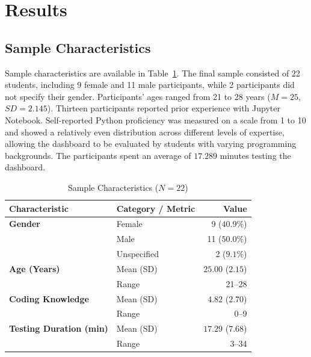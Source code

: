\section{Results}
\subsection{Sample Characteristics}

Sample characteristics are available in Table~\ref{tab:sample_characteristics}. The final sample consisted of 22 students, including 9 female and 11 male participants, while 2 participants did not specify their gender. Participants' ages ranged from 21 to 28 years ($M = 25$, $SD = 2.145$). Thirteen participants reported prior experience with Jupyter Notebook. Self-reported Python proficiency was measured on a scale from 1 to 10 and showed a relatively even distribution across different levels of expertise, allowing the dashboard to be evaluated by students with varying programming backgrounds. The participants spent an average of $17.289$ minutes testing the dashboard.
\begin{table}
  \centering
  \caption{Sample Characteristics ($N=22$)}
  \label{tab:sample_characteristics}
  \small
  \begin{tabular}{@{} l l r @{}} 
    \toprule
    \textbf{Characteristic} & \textbf{Category / Metric} & {\textbf{Value}} \\
    \midrule
    \textbf{Gender}         & Female                & 9 ($40.9\%$) \\
                            & Male                  & 11 ($50.0\%$) \\
                            & Unspecified           & 2 ($9.1\%$) \\
    \addlinespace
    \textbf{Age (Years)}    & Mean (SD)             & $25.00$ ($2.15$) \\
                            & Range                 & {21--28} \\
    \addlinespace
    \textbf{Coding Knowledge} & Mean (SD)          & $4.82$ ($2.70$) \\
                            & Range                 & {0--9} \\
    \addlinespace
    \textbf{Testing Duration (min)} & Mean (SD)   & $17.29$ ($7.68$) \\
                            & Range                 & {3--34} \\
    \bottomrule
  \end{tabular}
\end{table}

